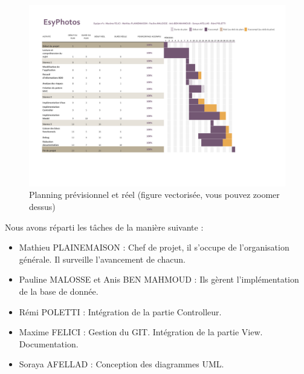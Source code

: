 \documentclass{article}
\begin{document}
\begin{flushleft}
\begin{figure}[!h]
  \begin{center}
    \includegraphics[scale=0.5]{fig4} %
    \caption{Planning prévisionnel et réel (figure vectorisée, vous pouvez zoomer dessus)}
  \end{center}
\end{figure}

Nous avons réparti les tâches de la manière suivante : \\

\begin{itemize}
  \item Mathieu PLAINEMAISON : Chef de projet, il s'occupe de l'organisation
  générale. Il surveille l'avancement de chacun.
  \item Pauline MALOSSE et Anis BEN MAHMOUD : Ils gèrent l'implémentation
  de la base de donnée.
  \item Rémi POLETTI : Intégration de la partie Controlleur.
  \item Maxime FELICI : Gestion du GIT. Intégration de la partie View.
  Documentation.
  \item Soraya AFELLAD : Conception des diagrammes UML.
\end{itemize}

\newpage

\end{flushleft}
\end{document}
